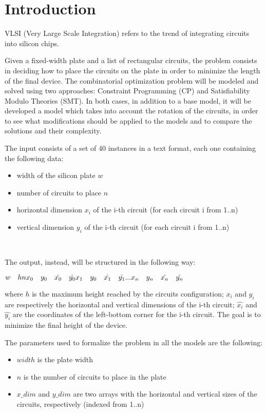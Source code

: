\section{Introduction}

VLSI (Very Large Scale Integration) refers to the trend of integrating circuits into silicon chips.

Given a fixed-width plate and a list of rectangular circuits, the problem consists in deciding how to place the circuits on the plate in order to minimize the length of the final device. The combinatorial optimization problem will be modeled and solved using two approaches: Constraint Programming (CP) and Satisfiability Modulo Theories (SMT). In both cases, in addition to a base model, it will be developed a model which takes into account the rotation of the circuits, in order to see what modifications should be applied to the models and to compare the solutions and their complexity.

The input consists of a set of 40 instances in a text format, each one containing the following data:

\begin{itemize}
    \item width of the silicon plate $w$
    \item number of circuits to place $n$
    \item horizontal dimension $x_i$ of the i-th circuit (for each circuit i from 1..n)
    \item vertical dimension $y_i$ of the i-th circuit (for each circuit i from 1..n)
\end{itemize}\

The output, instead, will be structured in the following way:

$ w \quad h \\
n \\
x_0\quad y_0\quad \hat{x_0}\quad \hat{y_0} \\
x_1\quad y_0\quad \hat{x_1}\quad \hat{y_1} \\
. . . \\
x_n\quad y_n\quad \hat{x_n}\quad \hat{y_n} \\
$

where $h$ is the maximum height reached by the circuits configuration; $x_i$ and $y_i$ are respectively the horizontal and vertical dimensions of the i-th circuit; $\hat{x_i}$ and $\hat{y_i}$ are the coordinates of the left-bottom corner for the i-th circuit. The goal is to minimize the final height of the device.

The parameters used to formalize the problem in all the models are the following:

\begin{itemize}
    \item $width$ is the plate width
    \item $n$ is the number of circuits to place in the plate
    \item $x\_dim$ and $y\_dim$ are two arrays with the horizontal and vertical sizes of the circuits, respectively (indexed from 1..n)
\end{itemize}\


